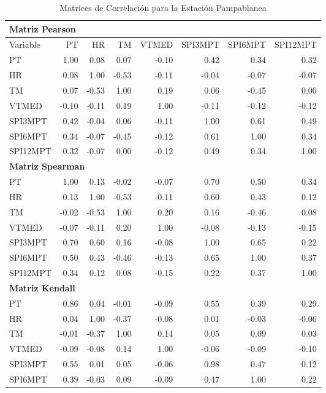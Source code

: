 \begin{table}[ht]
\centering
\caption{Matrices de Correlación para la Estación Pampablanca}
\begin{tabular}{lrrrrrrr}
\toprule
\multicolumn{8}{l}{\textbf{Matriz Pearson}} \\
\midrule
Variable & PT & HR & TM & VTMED & SPI3MPT & SPI6MPT & SPI12MPT \\
\midrule
PT       & 1.00 & 0.08 & 0.07 & -0.10 & 0.42 & 0.34 & 0.32 \\
HR       & 0.08 & 1.00 & -0.53 & -0.11 & -0.04 & -0.07 & -0.07 \\
TM       & 0.07 & -0.53 & 1.00 & 0.19 & 0.06 & -0.45 & 0.00 \\
VTMED    & -0.10 & -0.11 & 0.19 & 1.00 & -0.11 & -0.12 & -0.12 \\
SPI3MPT  & 0.42 & -0.04 & 0.06 & -0.11 & 1.00 & 0.61 & 0.49 \\
SPI6MPT  & 0.34 & -0.07 & -0.45 & -0.12 & 0.61 & 1.00 & 0.34 \\
SPI12MPT & 0.32 & -0.07 & 0.00 & -0.12 & 0.49 & 0.34 & 1.00 \\
\midrule
\multicolumn{8}{l}{\textbf{Matriz Spearman}} \\
\midrule
PT       & 1.00 & 0.13 & -0.02 & -0.07 & 0.70 & 0.50 & 0.34 \\
HR       & 0.13 & 1.00 & -0.53 & -0.11 & 0.60 & 0.43 & 0.12 \\
TM       & -0.02 & -0.53 & 1.00 & 0.20 & 0.16 & -0.46 & 0.08 \\
VTMED    & -0.07 & -0.11 & 0.20 & 1.00 & -0.08 & -0.13 & -0.15 \\
SPI3MPT  & 0.70 & 0.60 & 0.16 & -0.08 & 1.00 & 0.65 & 0.22 \\
SPI6MPT  & 0.50 & 0.43 & -0.46 & -0.13 & 0.65 & 1.00 & 0.37 \\
SPI12MPT & 0.34 & 0.12 & 0.08 & -0.15 & 0.22 & 0.37 & 1.00 \\
\midrule
\multicolumn{8}{l}{\textbf{Matriz Kendall}} \\
\midrule
PT       & 0.86 & 0.04 & -0.01 & -0.09 & 0.55 & 0.39 & 0.29 \\
HR       & 0.04 & 1.00 & -0.37 & -0.08 & 0.01 & -0.03 & -0.06 \\
TM       & -0.01 & -0.37 & 1.00 & 0.14 & 0.05 & 0.09 & 0.03 \\
VTMED    & -0.09 & -0.08 & 0.14 & 1.00 & -0.06 & -0.09 & -0.10 \\
SPI3MPT  & 0.55 & 0.01 & 0.05 & -0.06 & 0.98 & 0.47 & 0.12 \\
SPI6MPT  & 0.39 & -0.03 & 0.09 & -0.09 & 0.47 & 1.00 & 0.22 \\

\end{tabular}
\end{table}
